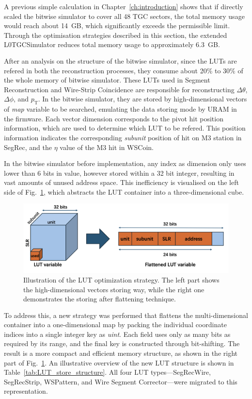 A previous simple calculation in Chapter~\ref{ch:introduction} shows that if directly scaled the bitwise simulator to cover all 48 TGC sectors, the total memory usage would reach about 14~GB, which significantly exceeds the permissible limit. Through the optimisation strategies described in this section, the extended L0TGCSimulator reduces total memory usage to approximately 6.3~GB.

After an analysis on the structure of the bitwise simulator, since the LUTs are refered in both the reconstruction processes, they consume about 20\% to 30\% of the whole memory of bitwise simulator. These LUTs used in Segment Reconstruction and Wire-Strip Coincidence are responsible for reconstructing $\Delta\theta$, $\Delta\phi$, and $p_{\mathrm{T}}$. In the bitwise simulator, they are stored by high-dimensional vectors of \textit{map} variable to be searched, emulating the data storing mode by URAM in the firmware. Each vector dimension corresponds to the pivot hit position information, which are used to determine which LUT to be refered. This position information indicates the corresponding \textit{subunit} position of hit on M3 station in SegRec, and the $\eta$ value of the M3 hit in WSCoin. 

In the bitwise simulator before implementation, any index as dimension only uses lower than 6 bits in value, however stored within a 32 bit integer, resulting in vast amounts of unused address space. This inefficiency is visualised on the left side of Fig.~\ref{fig:LUT_optimization}, which abstracts the LUT container into a three-dimensional cube.
\begin{figure}[htbp]
  \centering
  \includegraphics[width=1.0\textwidth]{figs/chapter5/LUT_optimization.png}
  \caption{Illustration of the LUT optimization strategy. The left part shows the high-dimensional vectors storing way, while the right one demonstrates the storing after flattening technique.}
  \label{fig:LUT_optimization}
\end{figure}

To address this, a new strategy was performed that flattens the multi-dimensional container into a one-dimensional map by packing the individual coordinate indices into a single integer key as \textit{uint}. Each field uses only as many bits as required by its range, and the final key is constructed through bit-shifting. The result is a more compact and efficient memory structure, as shown in the right part of Fig.~\ref{fig:LUT_optimization}. An illustrative overview of the new LUT structure is shown in Table~\ref{tab:LUT_store_structure}. All four LUT types—SegRecWire, SegRecStrip, WSPattern, and Wire Segment Corrector—were migrated to this representation.



